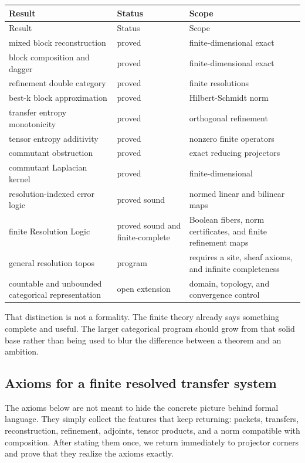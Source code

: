 \documentclass[11pt]{article}
\theoremstyle{definition}
\theoremstyle{remark}
\begin{document}
\begin{longtable}{L{2.05in}L{0.80in}L{2.95in}}
\toprule
Result & Status & Scope\\
\midrule
\endfirsthead
\toprule
Result & Status & Scope\\
\midrule
\endhead
mixed block reconstruction & proved & finite-dimensional exact \\
block composition and dagger & proved & finite-dimensional exact \\
refinement double category & proved & finite resolutions \\
best-k block approximation & proved & Hilbert-Schmidt norm \\
transfer entropy monotonicity & proved & orthogonal refinement \\
tensor entropy additivity & proved & nonzero finite operators \\
commutant obstruction & proved & exact reducing projectors \\
commutant Laplacian kernel & proved & finite-dimensional \\
resolution-indexed error logic & proved sound & normed linear and bilinear maps \\
finite Resolution Logic & proved sound and finite-complete & Boolean fibers, norm certificates, and finite refinement maps \\
general resolution topos & program & requires a site, sheaf axioms, and infinite completeness \\
countable and unbounded categorical representation & open extension & domain, topology, and convergence control \\
\bottomrule
\end{longtable}

That distinction is not a formality.  The finite theory already says something complete and useful.  The larger categorical program should grow from that solid base rather than being used to blur the difference between a theorem and an ambition.

\subsection{Axioms for a finite resolved transfer system}

The axioms below are not meant to hide the concrete picture behind formal language.  They simply collect the features that keep returning: packets, transfers, reconstruction, refinement, adjoints, tensor products, and a norm compatible with composition.  After stating them once, we return immediately to projector corners and prove that they realize the axioms exactly.
\end{document}

